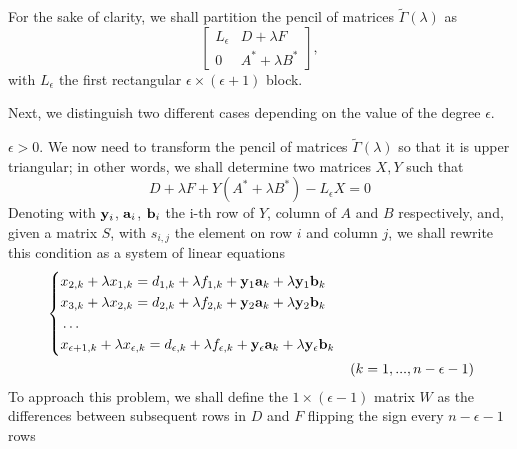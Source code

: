 For the sake of clarity, we shall partition the pencil of matrices \(\tilde{\Gamma}(\lambda)\) as
\[
    \begin{bmatrix}
        L_{\epsilon} & D + \lambda F \\
        0 & A^{*} + \lambda B^{*}
    \end{bmatrix},
\]
with \(L_{\epsilon}\) the first rectangular \(\epsilon \times (\epsilon + 1)\) block.

Next, we distinguish two different cases depending on the value of the degree \(\epsilon\).
\begin{cs}
    \case \(\epsilon > 0.\)
    We now need to transform the pencil of matrices \(\tilde{\Gamma}(\lambda)\) so that it is upper triangular;
    in other words, we shall determine two matrices \(X, Y\) such that
    \[
        D + \lambda F + Y(A^{*} + \lambda B^{*}) - L_{\epsilon}X = 0
    \]
    Denoting with \(\vb{y}_{i}\), \(\vb{a}_{i}\), \(\vb{b}_{i}\) the i-th row of \(Y\), column of \(A\) and
    \(B\) respectively, and, given a matrix \(S\), with \(s_{i, j}\) the element on row \(i\) and column \(j\),
    we shall rewrite this condition as a system of linear equations
    \begin{equation} \label{linear-system-x}
        \begin{aligned}
        & \left\{
            \begin{aligned}
                & x_{2, k} + \lambda x_{1, k} = d_{1, k} + \lambda f_{1, k} + \vb{y}_{1}\vb{a}_{k} +
                    \lambda \vb{y}_{1}\vb{b}_{k} \\
                & x_{3, k} + \lambda x_{2, k} = d_{2, k} + \lambda f_{2, k} + \vb{y}_{2}\vb{a}_{k} +
                    \lambda \vb{y}_{2}\vb{b}_{k} \\
                & \hdots \\
                & x_{\epsilon+1, k} + \lambda x_{\epsilon, k} =
                    d_{\epsilon, k} + \lambda f_{\epsilon, k} + \vb{y}_{\epsilon}\vb{a}_{k} +
                    \lambda \vb{y}_{\epsilon}\vb{b}_{k} \\
            \end{aligned}
        \right. \\
        & & (k = 1, ..., n - \epsilon - 1)
    \end{aligned}
    \end{equation}
    To approach this problem, we shall define the \(1 \times (\epsilon - 1)\) matrix \(W\) as the differences between
    subsequent rows in \(D\) and \(F\) flipping the sign every \(n - \epsilon - 1\) rows

\end{cs}
